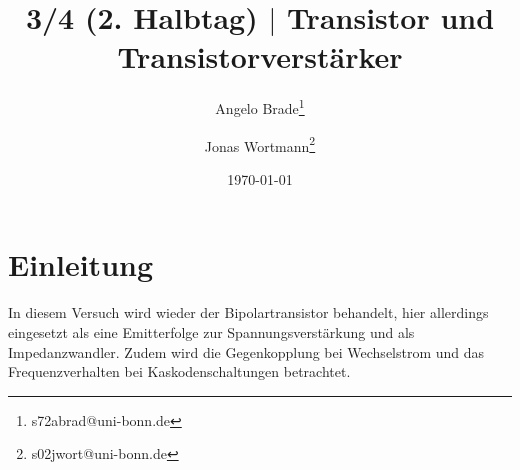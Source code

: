 \documentclass[a4paper,10pt]{article}
\numberwithin{equation}{section}
\begin{document}

\begin{titlepage}
        \title{3/4 (2. Halbtag) $|$ Transistor und Transistorverstärker}
        \author[1]{Angelo Brade\thanks{s72abrad@uni-bonn.de}}
        \author[1]{Jonas Wortmann\thanks{s02jwort@uni-bonn.de}}
        \date{\today}
\end{titlepage}

\maketitle
{}


\newpage


\fancyhead[R]{\thepage}
\fancyfoot[C]{}

\tableofcontents


\newpage


\fancyhead[L]{\leftmark}

\newpage
\section{Einleitung}
In diesem Versuch wird wieder der Bipolartransistor behandelt, hier allerdings eingesetzt als eine Emitterfolge zur Spannungsverstärkung und als Impedanzwandler.
Zudem wird die Gegenkopplung bei Wechselstrom und das Frequenzverhalten bei Kaskodenschaltungen betrachtet.

\newpage
\end{document}
